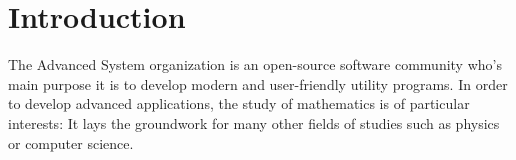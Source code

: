 \section{Introduction}

The Advanced System organization is an open-source software community who's main
purpose it is to develop modern and user-friendly utility programs. In order to
develop advanced applications, the study of mathematics is of particular interests:
It lays the groundwork for many other fields of studies such as physics or computer
science.
